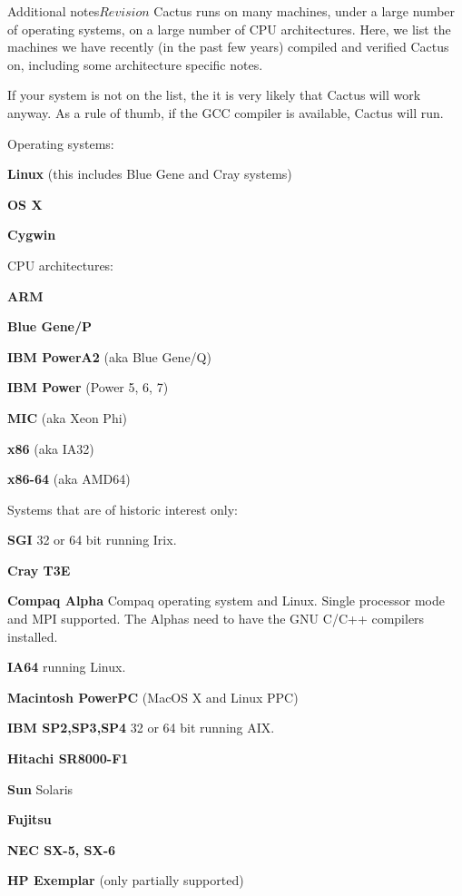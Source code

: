 \begin{cactuspart}{Additional notes}{}{$Revision$}
Cactus runs on many machines, under a large number of operating
systems, on a large number of CPU architectures. Here, we list the
machines we have recently (in the past few years) compiled and
verified Cactus on, including some architecture specific notes.

If your system is not on the list, the it is very likely that Cactus
will work anyway. As a rule of thumb, if the GCC compiler is
available, Cactus will run.

Operating systems:
\begin{Lentry}
\item[\textbf{Linux}] (this includes Blue Gene and Cray systems)
\item[\textbf{OS X}]
\item[\textbf{Cygwin}]
\end{Lentry}

CPU architectures:
\begin{Lentry}
\item[\textbf{ARM}]
\item[\textbf{Blue Gene/P}]
\item[\textbf{IBM PowerA2}] (aka Blue Gene/Q)
\item[\textbf{IBM Power}] (Power 5, 6, 7)
\item[\textbf{MIC}] (aka Xeon Phi)
\item[\textbf{x86}] (aka IA32)
\item[\textbf{x86-64}] (aka AMD64)
\end{Lentry}

Systems that are of historic interest only:
\begin{Lentry}
\item[\textbf{SGI}] 32 or 64 bit running Irix.
\item[\textbf{Cray T3E}]
\item[\textbf{Compaq Alpha}]  Compaq operating system and Linux.
  Single processor
  mode and MPI supported. The Alphas need to have the GNU C/C++
  compilers installed.
\item[\textbf{IA64}]  running Linux.
\item[\textbf{Macintosh PowerPC}] (MacOS X and Linux PPC)
\item[\textbf{IBM SP2,SP3,SP4}] 32 or 64 bit running AIX.
\item[\textbf{Hitachi SR8000-F1}]
\item[\textbf{Sun} Solaris]
\item[\textbf{Fujitsu}]
\item[\textbf{NEC SX-5, SX-6}]
\item[\textbf{HP Exemplar}] (only partially supported)
\end{Lentry}


\end{cactuspart}
